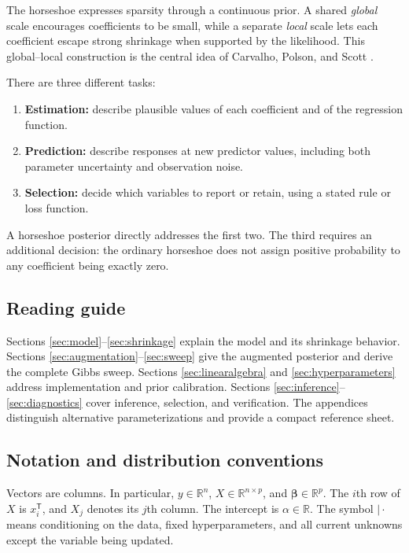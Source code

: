 \documentclass[11pt,letterpaper]{article}
\numberwithin{equation}{section}
\newcommand{\R}{\mathbb{R}}
\newcommand{\bbeta}{\bm{\beta}}
\newcommand{\trans}{^{\mathsf T}}
\begin{document}
The horseshoe expresses sparsity through a continuous prior. A shared
\emph{global} scale encourages coefficients to be small, while a separate
\emph{local} scale lets each coefficient escape strong shrinkage when supported
by the likelihood. This global--local construction is the central idea of
Carvalho, Polson, and Scott \cite{carvalho2009,carvalho2010}.

There are three different tasks:
\begin{enumerate}
\item \textbf{Estimation:} describe plausible values of each coefficient and
      of the regression function.
\item \textbf{Prediction:} describe responses at new predictor values, including
      both parameter uncertainty and observation noise.
\item \textbf{Selection:} decide which variables to report or retain, using a
      stated rule or loss function.
\end{enumerate}
A horseshoe posterior directly addresses the first two. The third requires an
additional decision: the ordinary horseshoe does not assign positive probability
to any coefficient being exactly zero.

\subsection{Reading guide}

Sections \ref{sec:model}--\ref{sec:shrinkage} explain the model and its shrinkage
behavior. Sections \ref{sec:augmentation}--\ref{sec:sweep} give the augmented
posterior and derive the complete Gibbs sweep. Sections \ref{sec:linearalgebra}
and \ref{sec:hyperparameters} address implementation and prior calibration.
Sections \ref{sec:inference}--\ref{sec:diagnostics} cover inference, selection,
and verification. The appendices distinguish alternative parameterizations and
provide a compact reference sheet.

\subsection{Notation and distribution conventions}

Vectors are columns. In particular, \(y\in\R^n\), \(X\in\R^{n\times p}\),
and \(\bbeta\in\R^p\). The \(i\)th row of \(X\) is \(x_i\trans\), and
\(X_j\) denotes its \(j\)th column. The intercept is \(\alpha\in\R\).
The symbol \(\mid\cdot\) means conditioning on the data, fixed hyperparameters,
and all current unknowns except the variable being updated.
\end{document}
